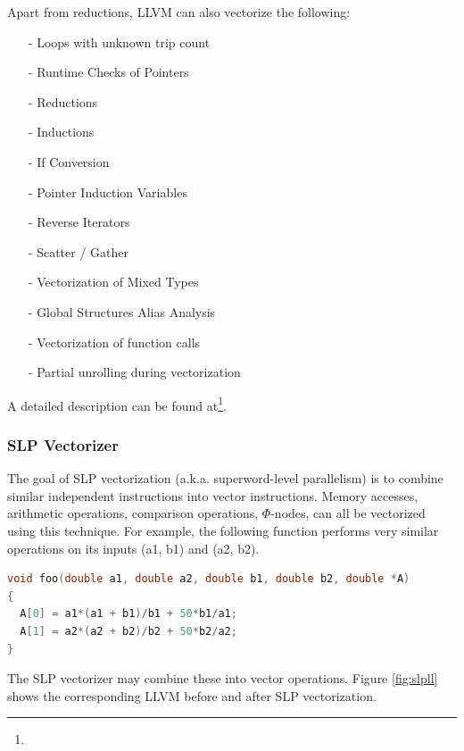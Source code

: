 \documentclass[a4paper,bibliography=totocnumbered,parskip,headsepline]{scrbook}
\begin{document}
Apart from reductions, LLVM can also vectorize the following:
\begin{itemize}[noitemsep]
 \item[-] Loops with unknown trip count
 \item[-] Runtime Checks of Pointers
 \item[-] Reductions
 \item[-] Inductions
 \item[-] If Conversion
 \item[-] Pointer Induction Variables
 \item[-] Reverse Iterators
 \item[-] Scatter / Gather
 \item[-] Vectorization of Mixed Types
 \item[-] Global Structures Alias Analysis
 \item[-] Vectorization of function calls
 \item[-] Partial unrolling during vectorization
\end{itemize}
A detailed description can be found at\footnote{}.

\subsubsection{SLP Vectorizer}
The goal of SLP vectorization (a.k.a. superword-level parallelism) is to combine similar independent instructions into vector instructions.
Memory accesses, arithmetic operations, comparison operations, $\Phi$-nodes, can all be vectorized using this technique.
For example, the following function performs very similar operations on its inputs (a1, b1) and (a2, b2).

\begin{minipage}{\textwidth}
\begin{lstlisting}[language=C]
void foo(double a1, double a2, double b1, double b2, double *A)
{
  A[0] = a1*(a1 + b1)/b1 + 50*b1/a1;
  A[1] = a2*(a2 + b2)/b2 + 50*b2/a2;
}
\end{lstlisting}
\end{minipage}

The SLP vectorizer may combine these into vector operations.
Figure \ref{fig:slpll} shows the corresponding LLVM before and after SLP vectorization.
\end{document}
